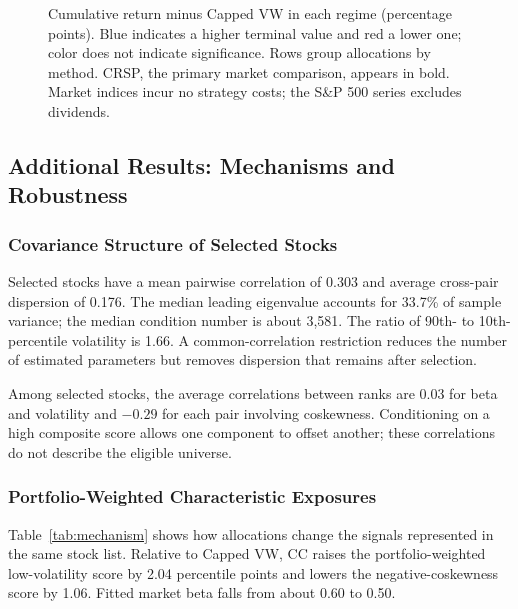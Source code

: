 \documentclass[letterpaper,journal]{IEEEtran}
\begin{document}
\begin{figure}[t]
\caption{Cumulative return minus Capped VW in each regime (percentage points). Blue indicates a higher terminal value and red a lower one; color does not indicate significance. Rows group allocations by method. CRSP, the primary market comparison, appears in bold. Market indices incur no strategy costs; the S\&P 500 series excludes dividends.}
\label{fig:regime_heatmap}
\end{figure}

\subsection{Additional Results: Mechanisms and Robustness}
\subsubsection{Covariance Structure of Selected Stocks}
Selected stocks have a mean pairwise correlation of 0.303 and average cross-pair dispersion of 0.176. The median leading eigenvalue accounts for 33.7\% of sample variance; the median condition number is about 3,581. The ratio of 90th- to 10th-percentile volatility is 1.66. A common-correlation restriction reduces the number of estimated parameters but removes dispersion that remains after selection.

Among selected stocks, the average correlations between ranks are 0.03 for beta and volatility and $-0.29$ for each pair involving coskewness. Conditioning on a high composite score allows one component to offset another; these correlations do not describe the eligible universe.

\subsubsection{Portfolio-Weighted Characteristic Exposures}
Table~\ref{tab:mechanism} shows how allocations change the signals represented in the same stock list. Relative to Capped VW, CC raises the portfolio-weighted low-volatility score by 2.04 percentile points and lowers the negative-coskewness score by 1.06. Fitted market beta falls from about 0.60 to 0.50.
\end{document}
